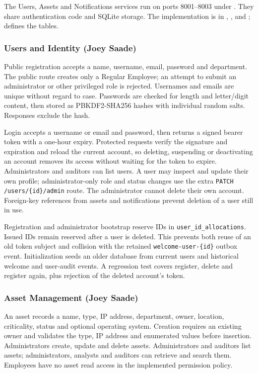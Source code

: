 The Users, Assets and Notifications services run on ports 8001--8003 under . They share authentication code and SQLite storage. The implementation is in , ,  and ;  defines the tables.

\subsubsection{Users and Identity (Joey Saade)}

Public registration accepts a name, username, email, password and department. The public route creates only a Regular Employee; an attempt to submit an administrator or other privileged role is rejected. Usernames and emails are unique without regard to case. Passwords are checked for length and letter/digit content, then stored as PBKDF2-SHA256 hashes with individual random salts. Responses exclude the hash.

Login accepts a username or email and password, then returns a signed bearer token with a one-hour expiry. Protected requests verify the signature and expiration and reload the current account, so deleting, suspending or deactivating an account removes its access without waiting for the token to expire. Administrators and auditors can list users. A user may inspect and update their own profile; administrator-only role and status changes use the extra \texttt{PATCH /users/\{id\}/admin} route. The administrator cannot delete their own account. Foreign-key references from assets and notifications prevent deletion of a user still in use.

Registration and administrator bootstrap reserve IDs in \texttt{user\_id\_allocations}. Issued IDs remain reserved after a user is deleted. This prevents both reuse of an old token subject and collision with the retained \texttt{welcome-user-\{id\}} outbox event. Initialization seeds an older database from current users and historical welcome and user-audit events. A regression test covers register, delete and register again, plus rejection of the deleted account's token.

\subsubsection{Asset Management (Joey Saade)}

An asset records a name, type, IP address, department, owner, location, criticality, status and optional operating system. Creation requires an existing owner and validates the type, IP address and enumerated values before insertion. Administrators create, update and delete assets. Administrators and auditors list assets; administrators, analysts and auditors can retrieve and search them. Employees have no asset read access in the implemented permission policy.

